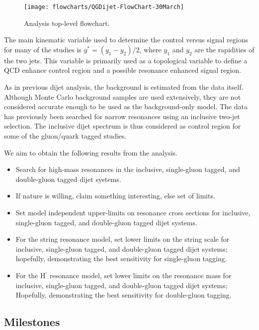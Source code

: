 \begin{figure}[htb]
\centering
\texttt{[image: flowcharts/QGDijet-FlowChart-30March]}
\caption{Analysis top-level flowchart.
\label{eflow}}
\end{figure}

The main kinematic variable used to determine the control versus
signal regions for many of the studies is $y^* = (y_1-y_2)/2$, where
$y_1$ and $y_2$ are the rapidities of the two jets.
This variable is primarily used as a topological variable to define a QCD
enhance control region and a possible resonance enhanced signal region.

As in previous dijet analysis, the background is estimated from the
data itself.
Although Monte Carlo background samples are used extensively, they are
not considered accurate enough to be used as the background-only model.
The data has previously been searched for narrow resonances using an
inclusive two-jet selection.
The inclusive dijet spectrum is thus considered as control region for
some of the gluon/quark tagged studies. 

We aim to obtain the following results from the analysis.

\begin{itemize}
\item Search for high-mass resonances in the inclusive, single-gluon tagged,
  and double-gluon tagged dijet systems.
\item If nature is willing, claim something interesting, else set of
  limits. 
\item Set model independent upper-limits on resonance cross sections for
  inclusive, single-gluon tagged, and double-gluon tagged dijet systems.
\item For the string resonance model, set lower limits on the string
  scale for inclusive, single-gluon tagged, and double-gluon tagged
  dijet systems; hopefully, demonstrating the best sensitivity for
  single-gluon tagging.
\item For the H$^\prime$ resonance model, set lower limits on the
  resonance mass for inclusive, single-gluon tagged, and double-gluon
  tagged dijet systems; Hopefully, demonstrating the best sensitivity
  for  double-gluon tagging.
\end{itemize}

\subsection{Milestones}

